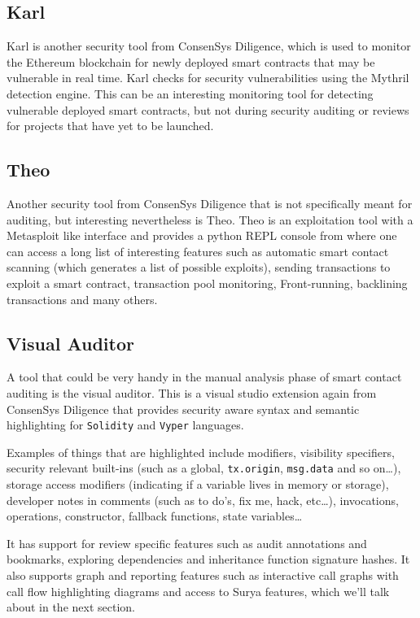 \subsection{Karl}\label{karl}

Karl is another security tool from ConsenSys Diligence, which is used to
monitor the Ethereum blockchain for newly deployed smart contracts that
may be vulnerable in real time. Karl checks for security vulnerabilities
using the Mythril detection engine. This can be an interesting
monitoring tool for detecting vulnerable deployed smart contracts, but
not during security auditing or reviews for projects that have yet to be
launched.

\subsection{Theo}\label{theo}

Another security tool from ConsenSys Diligence that is not specifically
meant for auditing, but interesting nevertheless is Theo. Theo is an
exploitation tool with a Metasploit like interface and provides a python
REPL console from where one can access a long list of interesting
features such as automatic smart contact scanning (which generates a
list of possible exploits), sending transactions to exploit a smart
contract, transaction pool monitoring, Front-running, backlining
transactions and many others.

\subsection{Visual Auditor}\label{visual-auditor}

A tool that could be very handy in the manual analysis phase of smart
contact auditing is the visual auditor. This is a visual studio
extension again from ConsenSys Diligence that provides security aware
syntax and semantic highlighting for \texttt{Solidity} and
\texttt{Vyper} languages.

Examples of things that are highlighted include modifiers, visibility
specifiers, security relevant built-ins (such as a global,
\texttt{tx.origin}, \texttt{msg.data} and so on\ldots), storage access
modifiers (indicating if a variable lives in memory or storage),
developer notes in comments (such as to do's, fix me, hack, etc\ldots),
invocations, operations, constructor, fallback functions, state
variables\ldots{}

It has support for review specific features such as audit annotations
and bookmarks, exploring dependencies and inheritance function signature
hashes. It also supports graph and reporting features such as
interactive call graphs with call flow highlighting diagrams and access
to Surya features, which we'll talk about in the next section.

